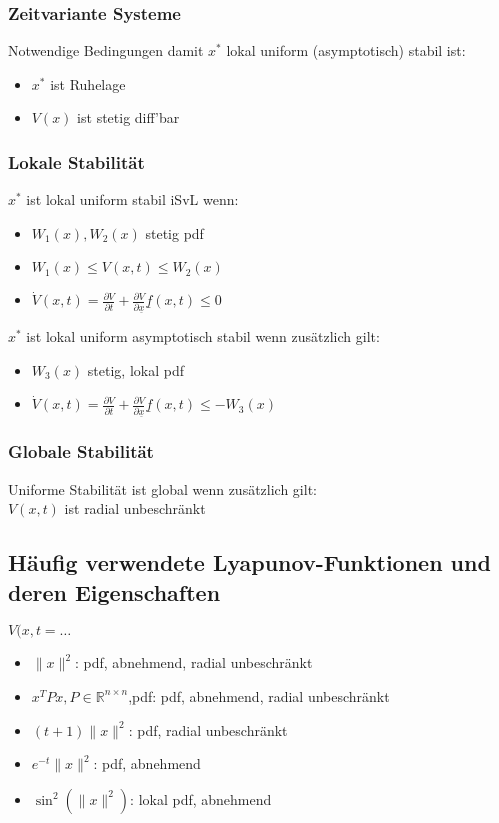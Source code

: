 \documentclass[6pt,a4paper,fleqn]{scrartcl}
\begin{document}
\begin{multicols*}{4}
\subsubsection*{Zeitvariante Systeme}
Notwendige Bedingungen damit $x^*$ lokal uniform (asymptotisch) stabil ist:
\begin{itemize}
  \item $x^*$ ist Ruhelage
  \item $V(x)$ ist stetig diff'bar
\end{itemize}

\subsubsection*{Lokale Stabilität}
$x^*$ ist lokal uniform stabil iSvL wenn:
\begin{itemize}
  \item $W_1(x), W_2(x)$ stetig pdf
  \item $W_1(x) \leq V(x,t) \leq W_2(x)$
  \item $\dot{V}(x,t) = \frac{\partial V}{\partial t} + \frac{\partial V}{\partial \underline{x}} \underline{f}(x,t) \leq 0$
\end{itemize}

$x^*$ ist lokal uniform asymptotisch stabil wenn zusätzlich gilt:
\begin{itemize}
  \item $W_3(x)$ stetig, lokal pdf
  \item $\dot{V}(x,t) = \frac{\partial V}{\partial t} + \frac{\partial V}{\partial \underline{x}} \underline{f}(x,t) \leq -W_3(x)$
\end{itemize}

\subsubsection*{Globale Stabilität}
Uniforme Stabilität ist global wenn zusätzlich gilt: \\
$V(x,t)$ ist radial unbeschränkt


\subsection{Häufig verwendete Lyapunov-Funktionen und deren Eigenschaften}
$V(x,t = \dots$
\begin{itemize}
  \item $\|x\|^2$: pdf, abnehmend, radial unbeschränkt
  \item $x^T P x, P \in \mathbb{R}^{n \times n}$,pdf: pdf, abnehmend, radial unbeschränkt
  \item $(t+1) \|x\|^2$: pdf, radial unbeschränkt
  \item $e^{-t}\|x\|^2$: pdf, abnehmend
  \item $\sin^2(\|x\|^2)$: lokal pdf, abnehmend
\end{itemize}



\end{multicols*}
\end{document}

